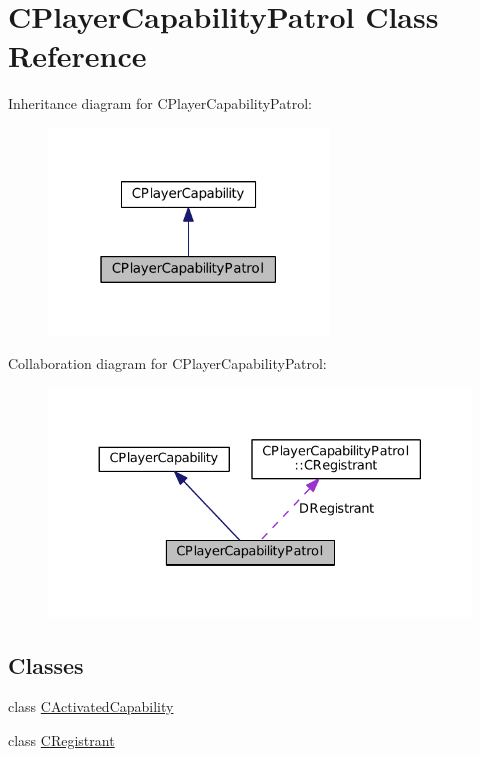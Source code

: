 \hypertarget{classCPlayerCapabilityPatrol}{}\section{C\+Player\+Capability\+Patrol Class Reference}
\label{classCPlayerCapabilityPatrol}


Inheritance diagram for C\+Player\+Capability\+Patrol\+:
\nopagebreak
\begin{figure}[H]
\begin{center}
\leavevmode
\includegraphics[width=211pt]{classCPlayerCapabilityPatrol__inherit__graph}
\end{center}
\end{figure}


Collaboration diagram for C\+Player\+Capability\+Patrol\+:
\nopagebreak
\begin{figure}[H]
\begin{center}
\leavevmode
\includegraphics[width=330pt]{classCPlayerCapabilityPatrol__coll__graph}
\end{center}
\end{figure}
\subsection*{Classes}
\begin{DoxyCompactItemize}
\item 
class \hyperlink{classCPlayerCapabilityPatrol_1_1CActivatedCapability}{C\+Activated\+Capability}
\item 
class \hyperlink{classCPlayerCapabilityPatrol_1_1CRegistrant}{C\+Registrant}
\end{DoxyCompactItemize}
